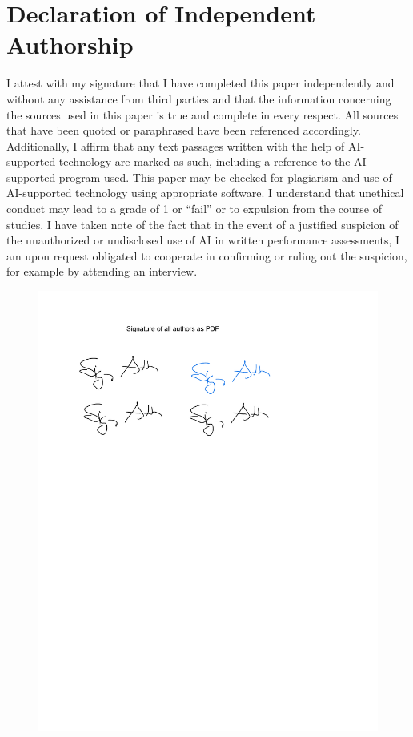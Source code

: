 \clearpage
\section{Declaration of Independent Authorship}\label{sec:integrity}

I attest with my signature that I have completed this paper independently and without any assistance from third parties and that the information concerning the sources used in this paper is true and complete in every respect. All sources that have been quoted or paraphrased have been referenced accordingly.
Additionally, I affirm that any text passages written with the help of AI-supported technology are marked as such, including a reference to the AI-supported program used.
This paper may be checked for plagiarism and use of AI-supported technology using appropriate software. I understand that unethical conduct may lead to a grade of 1 or “fail” or to expulsion from the course of studies.
I have taken note of the fact that in the event of a justified suspicion of the unauthorized or undisclosed use of AI in written performance assessments, I am upon request obligated to cooperate in confirming or ruling out the suspicion, for example by attending an interview.

\begin{figure}[b]
    \centering
    \includegraphics[width=1\textwidth, trim=0pt 500pt 0pt 50pt, clip]{images/example.pdf}
\end{figure}

